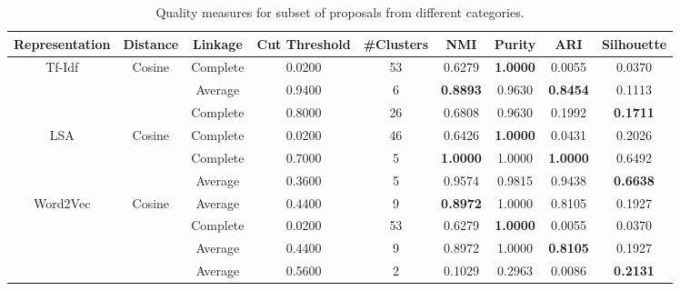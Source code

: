 \begin{table}[!htpb]
\centering
{\scriptsize %
\begin{tabular}{c|c|c|c|c|c|c|c|c}
 \hline
Representation & Distance & Linkage & Cut Threshold & \#Clusters & NMI & Purity & ARI & Silhouette\\
\hline
\hline
\multirow{3}{*}{Tf-Idf}  & \multirow{3}{*}{Cosine}  & Complete & 0.0200 & 53 & 0.6279 & \textbf{1.0000}&  0.0055 & 0.0370 \\
 & & Average & 0.9400 & 6 & \textbf{0.8893} &  0.9630 & \textbf{0.8454} & 0.1113  \\
 & & Complete & 0.8000 & 26 & 0.6808 &  0.9630 & 0.1992 & \textbf{0.1711} \\
\cline{1-9}
\multirow{3}{*}{LSA}  & \multirow{3}{*}{Cosine}  & Complete & 0.0200 & 46 & 0.6426 & \textbf{1.0000}&  0.0431 & 0.2026 \\
 & & Complete & 0.7000 & 5 & \textbf{1.0000} &  1.0000 & \textbf{1.0000} & 0.6492  \\
 & & Average & 0.3600 & 5 & 0.9574 &  0.9815 & 0.9438 & \textbf{0.6638} \\
\cline{1-9}
\multirow{4}{*}{Word2Vec}  & \multirow{4}{*}{Cosine}  & Average & 0.4400 & 9 & \textbf{0.8972} & 1.0000 & 0.8105 & 0.1927 \\
 & & Complete & 0.0200 & 53 & 0.6279 & \textbf{1.0000}&  0.0055 & 0.0370 \\
 & & Average & 0.4400 & 9 & 0.8972 &  1.0000 & \textbf{0.8105} & 0.1927  \\
 & & Average & 0.5600 & 2 & 0.1029 &  0.2963 & 0.0086 & \textbf{0.2131} \\
\cline{1-9}
\hline
\end{tabular}
}%
\caption{Quality measures for subset of proposals from different categories.}
\label{tab:mix.scores}
\end{table}